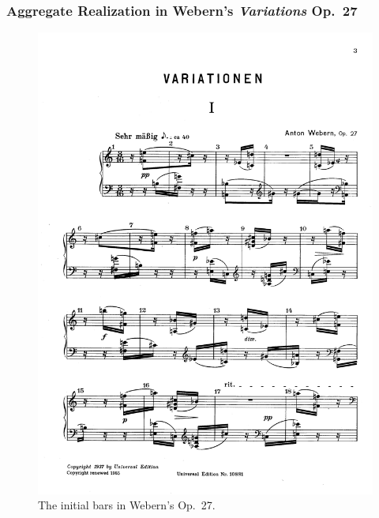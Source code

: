 \begin{frame}
	\frametitle{Aggregate Realization in Webern's \emph{Variations} Op.~27}
	\begin{figure}
		\centering
		\includegraphics[width=\textwidth]{figures/webern1.pdf}
		\caption[Bars 1--7 in Webern's Op.~27]{The initial bars in Webern's Op.~27.}
	\end{figure}
\end{frame}

